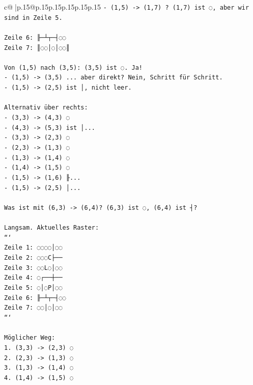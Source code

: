 \documentclass{article}
\begin{document}
{\begin{supertabular}{c@{$\;$}|p{.15\linewidth}@{}p{.15\linewidth}p{.15\linewidth}p{.15\linewidth}p{.15\linewidth}p{.15\linewidth}}
{{{\texttt{{-} (1,5) {-}> (1,7) ? (1,7) ist ◌, aber wir sind in Zeile 5.} \\
\\ 
\texttt{Zeile 6: ╟─┴┬─┤◌◌} \\
\texttt{Zeile 7: ║◌◌│◌│◌◌║} \\
\\ 
\texttt{Von (1,5) nach (3,5): (3,5) ist ◌. Ja!} \\
\texttt{{-} (1,5) {-}> (3,5) ... aber direkt? Nein, Schritt für Schritt.} \\
\texttt{{-} (1,5) {-}> (2,5) ist │, nicht leer.} \\
\\ 
\texttt{Alternativ über rechts:} \\
\texttt{{-} (3,3) {-}> (4,3) ◌} \\
\texttt{{-} (4,3) {-}> (5,3) ist │... } \\
\texttt{{-} (3,3) {-}> (2,3) ◌} \\
\texttt{{-} (2,3) {-}> (1,3) ◌} \\
\texttt{{-} (1,3) {-}> (1,4) ◌} \\
\texttt{{-} (1,4) {-}> (1,5) ◌} \\
\texttt{{-} (1,5) {-}> (1,6) ╟... } \\
\texttt{{-} (1,5) {-}> (2,5) │...} \\
\\ 
\texttt{Was ist mit (6,3) {-}> (6,4)? (6,3) ist ◌, (6,4) ist ┤?} \\
\\ 
\texttt{Langsam. Aktuelles Raster:} \\
\texttt{```} \\
\texttt{Zeile 1: ◌◌◌◌│◌◌} \\
\texttt{Zeile 2: ◌◌◌C├──} \\
\texttt{Zeile 3: ◌◌L◌│◌◌} \\
\texttt{Zeile 4: ◌┌──┼──} \\
\texttt{Zeile 5: ◌│◌P│◌◌} \\
\texttt{Zeile 6: ╟─┴┬─┤◌◌} \\
\texttt{Zeile 7: ◌◌│◌│◌◌} \\
\texttt{```} \\
\\ 
\texttt{Möglicher Weg:} \\
\texttt{1. (3,3) {-}> (2,3) ◌} \\
\texttt{2. (2,3) {-}> (1,3) ◌} \\
\texttt{3. (1,3) {-}> (1,4) ◌} \\
\texttt{4. (1,4) {-}> (1,5) ◌} \\
}}}
\end{supertabular}}
\end{document}
